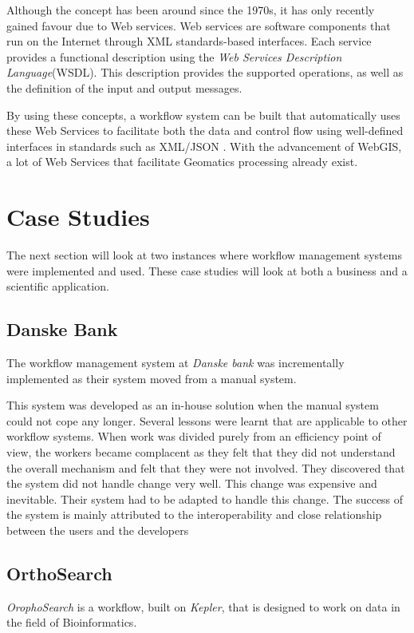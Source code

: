 Although the concept has been around since the 1970s, it has only recently
gained favour due to Web services.  Web services are software components that run on the
Internet through XML standards-based
interfaces\cite{Tai:2004:CCW:1045658.1045680}.  Each service provides a
functional description using the \emph{Web Services Description Language}(WSDL).
This description provides the supported operations, as well as the definition
of the input and output messages.

By using these concepts, a workflow system can be built that automatically uses
these Web Services to facilitate both the data and control flow using well-defined
interfaces in standards such as XML/JSON \cite{Shegalov:2001:XWM:767132.767139}. 
With the advancement of WebGIS, a lot
of Web Services that facilitate Geomatics processing already exist.


\section{Case Studies\label{casestudy}}
The next section will look at two instances where workflow management systems
were implemented and used.  These case studies will look at both a business and
a scientific application.
    \subsection*{Danske Bank}
      The workflow management system at \emph{Danske bank} was incrementally
      implemented as their system moved from a manual
      system\cite{Brahe:2007:SWW:1316624.1316661}.

      This system was developed as an in-house solution when the manual system
      could not cope any longer.  Several lessons were learnt that are applicable
      to other workflow systems. When work was divided purely from an
      efficiency point of view, the workers became complacent as they felt that
      they did not understand the overall mechanism and felt that they were not
      involved. They discovered that the system did not handle change very
      well. This change was expensive and inevitable. Their system had to be
      adapted to handle this change. The success of the system is mainly
      attributed to the interoperability and close relationship between the
      users and the developers

    \subsection*{OrthoSearch}
      \emph{OrophoSearch} is a workflow, built on \emph{Kepler}, that is
      designed to work on data in the field of Bioinformatics.
      \cite{daCruz:2008:OSW:1363686.1363983}

